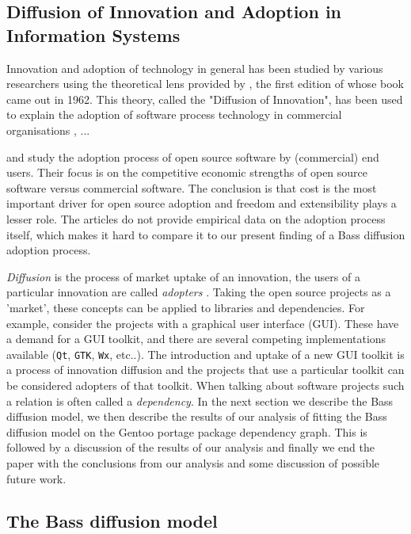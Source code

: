 \documentclass[smallextended,final]{svjour3}
\begin{document}
\subsection{Diffusion of Innovation and Adoption in Information Systems}
Innovation and adoption of technology in general has been studied by various researchers using the theoretical lens provided by \citet{rogers10}, the first edition of whose book came out in 1962. This theory, called the "Diffusion of Innovation", has been used to explain the adoption of software process technology in commercial organisations \citep{fichman93}, ...

\citet{dedrick04} and \citet{chen06} study the adoption process of open source software by (commercial) end users. Their focus is on the competitive economic strengths of open source software versus commercial software. The conclusion is that cost is the most important driver for open source adoption and freedom and extensibility plays a lesser role. The articles do not provide empirical data on the adoption process itself, which makes it hard to compare it to our present finding of a Bass diffusion adoption process.


\emph{Diffusion} is the process of market uptake of an innovation, the users of a particular innovation are called \emph{adopters} \citep{narayanan01}. Taking the open source projects as a 'market', these concepts can be applied to libraries and dependencies. For example, consider the projects with a graphical user interface (GUI). These have a demand for a GUI toolkit, and there are several competing implementations available (\verb|Qt|, \verb|GTK|, \verb|Wx|, etc..). The introduction and uptake of a new GUI toolkit is a process of innovation diffusion and the projects that use a particular toolkit can be considered adopters of that toolkit. When talking about software projects such a relation is often called a \emph{dependency}.
In the next section we describe the Bass \citep{bass69}  diffusion model, we then describe the results of our analysis of fitting the Bass diffusion model on the Gentoo portage package dependency graph. This is followed by a discussion of the results of our analysis and finally we end the paper with the conclusions from our analysis and some discussion of possible future work.



\subsection{The Bass diffusion model}\label{sect:Bass}
\end{document}
